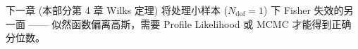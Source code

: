 下一章 (本部分第 4 章 Wilks 定理) 将处理小样本 ($N_\mathrm{dof}=1$) 下 Fisher 失效的另一面 —— 似然函数偏离高斯，需要 Profile Likelihood 或 MCMC 才能得到正确分位数。

